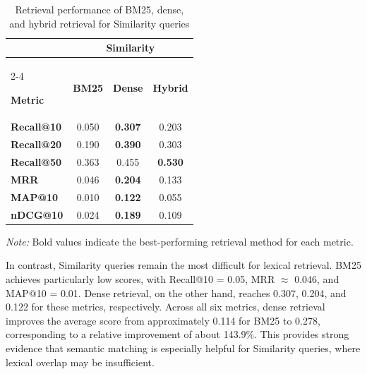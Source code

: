 \begin{table}[H]
    \centering
    \caption{Retrieval performance of BM25, dense, and hybrid retrieval for Similarity queries}
    \label{tab:retrieval_similarity}

    \small
    \renewcommand{\arraystretch}{1.4}
    \setlength{\tabcolsep}{12pt}

    \begin{tabular}{l ccc}
        \toprule
        & \multicolumn{3}{c}{\textbf{Similarity}} \\
        \cmidrule(lr){2-4}

        \textbf{Metric} &
        \textbf{BM25} &
        \textbf{Dense} &
        \textbf{Hybrid} \\
        \midrule

        \textbf{Recall@10} &
        0.050 & \textbf{0.307} & 0.203 \\

        \textbf{Recall@20} &
        0.190 & \textbf{0.390} & 0.303 \\

        \textbf{Recall@50} &
        0.363 & 0.455 & \textbf{0.530} \\

        \textbf{MRR} &
        0.046 & \textbf{0.204} & 0.133 \\

        \textbf{MAP@10} &
        0.010 & \textbf{0.122} & 0.055 \\

        \textbf{nDCG@10} &
        0.024 & \textbf{0.189} & 0.109 \\

        \bottomrule
    \end{tabular}

    \par\vspace{4pt}
    \begin{minipage}{0.75\textwidth}
        \footnotesize
        \textit{Note:} Bold values indicate the
        best-performing retrieval method for each metric.
    \end{minipage}

\end{table}
In contrast, Similarity queries remain the most difficult for lexical retrieval. BM25 achieves particularly low scores, with Recall@10 = 0.05, MRR $\approx$ 0.046, and MAP@10 = 0.01. Dense retrieval, on the other hand, reaches 0.307, 0.204, and 0.122 for these metrics, respectively. Across all six metrics, dense retrieval improves the average score from approximately 0.114 for BM25 to 0.278, corresponding to a relative improvement of about 143.9\%. This provides strong evidence that semantic matching is especially helpful for Similarity queries, where lexical overlap may be insufficient.

